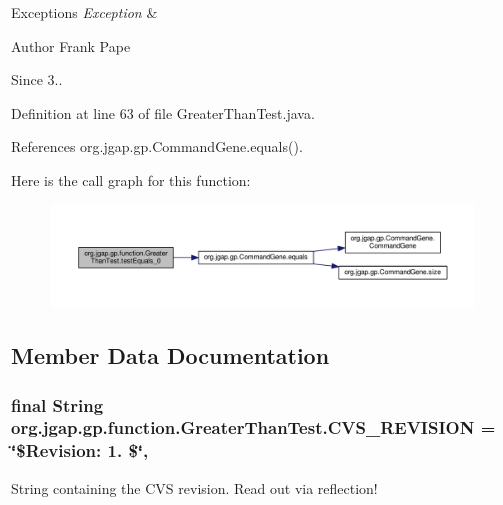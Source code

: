 \begin{DoxyExceptions}{Exceptions}
{\em Exception} & \\
\hline
\end{DoxyExceptions}
\begin{DoxyAuthor}{Author}
Frank Pape 
\end{DoxyAuthor}
\begin{DoxySince}{Since}
3.. 
\end{DoxySince}


Definition at line 63 of file Greater\-Than\-Test.\-java.



References org.\-jgap.\-gp.\-Command\-Gene.\-equals().



Here is the call graph for this function\-:
\nopagebreak
\begin{figure}[H]
\begin{center}
\leavevmode
\includegraphics[width=350pt]{classorg_1_1jgap_1_1gp_1_1function_1_1_greater_than_test_a376e562cedb5d2c6edafb3744a751519_cgraph}
\end{center}
\end{figure}




\subsection{Member Data Documentation}
\hypertarget{classorg_1_1jgap_1_1gp_1_1function_1_1_greater_than_test_a8fbd7beb85ab5b186f2687261e268dab}{
\subsubsection[{C\-V\-S\-\_\-\-R\-E\-V\-I\-S\-I\-O\-N}]{\setlength{\rightskip}{0pt plus 5cm}final String org.\-jgap.\-gp.\-function.\-Greater\-Than\-Test.\-C\-V\-S\-\_\-\-R\-E\-V\-I\-S\-I\-O\-N = \char`\"{}\$Revision\-: 1. \$\char`\"{}\hspace{0.3cm}{\ttfamily [static]}, {\ttfamily [private]}}}\label{classorg_1_1jgap_1_1gp_1_1function_1_1_greater_than_test_a8fbd7beb85ab5b186f2687261e268dab}
String containing the C\-V\-S revision. Read out via reflection! 

